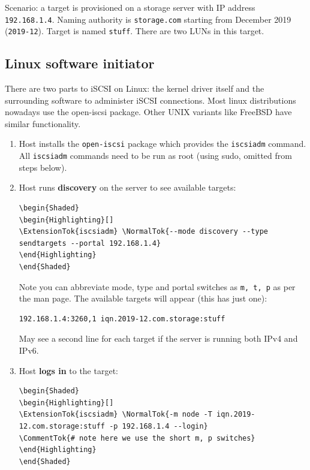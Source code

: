 Scenario: a target is provisioned on a storage server with IP address
\texttt{192.168.1.4}. Naming authority is \texttt{storage.com} starting
from December 2019 (\texttt{2019-12}). Target is named \texttt{stuff}.
There are two LUNs in this target.

\subsection{Linux software initiator}
\label{sec:linux-software-initiator}

There are two parts to iSCSI on Linux: the kernel driver itself and the
surrounding software to administer iSCSI connections. Most linux
distributions nowadays use the open-iscsi package. Other UNIX variants
like FreeBSD have similar functionality.

\begin{enumerate}
\def\labelenumi{\arabic{enumi}.}
\item
  Host installs the \texttt{open-iscsi} package which provides the
  \texttt{iscsiadm} command. All \texttt{iscsiadm} commands need to be
  run as root (using sudo, omitted from steps below).
\item
  Host runs \textbf{discovery} on the server to see available targets:

\begin{verbatim}
\begin{Shaded}
\begin{Highlighting}[]
\ExtensionTok{iscsiadm} \NormalTok{--mode discovery --type sendtargets --portal 192.168.1.4}
\end{Highlighting}
\end{Shaded}
\end{verbatim}

  Note you can abbreviate mode, type and portal switches as
  \texttt{m,\ t,\ p} as per the man page. The available targets will
  appear (this has just one):

\begin{verbatim}
192.168.1.4:3260,1 iqn.2019-12.com.storage:stuff
\end{verbatim}

  May see a second line for each target if the server is running both
  IPv4 and IPv6.
\item
  Host \textbf{logs in} to the target:

\begin{verbatim}
\begin{Shaded}
\begin{Highlighting}[]
\ExtensionTok{iscsiadm} \NormalTok{-m node -T iqn.2019-12.com.storage:stuff -p 192.168.1.4 --login}
\CommentTok{# note here we use the short m, p switches}
\end{Highlighting}
\end{Shaded}
\end{verbatim}


\end{enumerate}

